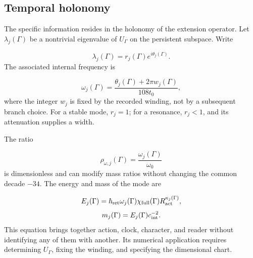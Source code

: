\subsection{Temporal holonomy}
The specific information resides in the holonomy of the extension operator. Let \(\lambda_j(\Gamma)\) be a nontrivial eigenvalue of \(U_\Gamma\) on the persistent subspace. Write

\[
 \lambda_j(\Gamma)=r_j(\Gamma)e^{i\theta_j(\Gamma)}.
\]
The associated internal frequency is

\[
 \omega_j(\Gamma)
 =\frac{\theta_j(\Gamma)+2\pi w_j(\Gamma)}{108t_0},
\]
where the integer \(w_j\) is fixed by the recorded winding, not by a subsequent branch choice. For a stable mode, \(r_j=1\); for a resonance, \(r_j<1\), and its attenuation supplies a width.

The ratio

\[
 \rho_{\omega,j}(\Gamma)
 =\frac{\omega_j(\Gamma)}{\omega_0}
\]
is dimensionless and can modify mass ratios without changing the common decade \(-34\). The energy and mass of the mode are

\[
 E_j(\Gamma)=\hbar_{\rm ret}\omega_j(\Gamma)
 \chi_{\rm full}(\Gamma)R_{\rm act}^{\kappa_j(\Gamma)},
\]
\[
 m_j(\Gamma)=E_j(\Gamma)c_{\rm int}^{-2}.
\]
This equation brings together action, clock, character, and reader without identifying any of them with another. Its numerical application requires determining \(U_\Gamma\), fixing the winding, and specifying the dimensional chart.
